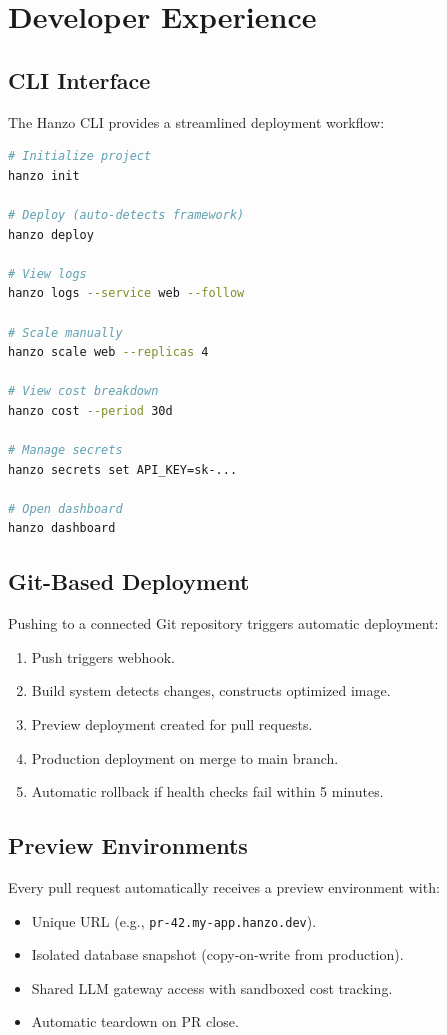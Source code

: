 \section{Developer Experience}

\label{sec:dx}

\subsection{CLI Interface}

The Hanzo CLI provides a streamlined deployment workflow:

\begin{lstlisting}[language=bash,caption={Hanzo CLI deployment workflow.}]
# Initialize project
hanzo init

# Deploy (auto-detects framework)
hanzo deploy

# View logs
hanzo logs --service web --follow

# Scale manually
hanzo scale web --replicas 4

# View cost breakdown
hanzo cost --period 30d

# Manage secrets
hanzo secrets set API_KEY=sk-...

# Open dashboard
hanzo dashboard
\end{lstlisting}

\subsection{Git-Based Deployment}

Pushing to a connected Git repository triggers automatic deployment:

\begin{enumerate}[leftmargin=1.4em]
    \item Push triggers webhook.
    \item Build system detects changes, constructs optimized image.
    \item Preview deployment created for pull requests.
    \item Production deployment on merge to main branch.
    \item Automatic rollback if health checks fail within 5 minutes.
\end{enumerate}

\subsection{Preview Environments}

Every pull request automatically receives a preview environment with:
\begin{itemize}[leftmargin=1.1em]
    \item Unique URL (e.g., \texttt{pr-42.my-app.hanzo.dev}).
    \item Isolated database snapshot (copy-on-write from production).
    \item Shared LLM gateway access with sandboxed cost tracking.
    \item Automatic teardown on PR close.
\end{itemize}

